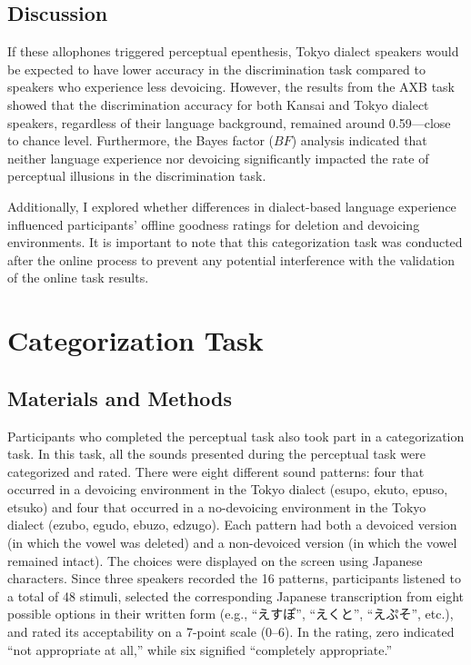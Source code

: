 \subsection{Discussion}

If these allophones triggered perceptual epenthesis, Tokyo dialect speakers would be expected to have lower accuracy in the discrimination task compared to speakers who experience less devoicing. However, the results from the AXB task showed that the discrimination accuracy for both Kansai and Tokyo dialect speakers, regardless of their language background, remained around 0.59---close to chance level. Furthermore, the Bayes factor ($BF$) analysis indicated that neither language experience nor devoicing significantly impacted the rate of perceptual illusions in the discrimination task.

Additionally, I explored whether differences in dialect-based language experience influenced participants' offline goodness ratings for deletion and devoicing environments. It is important to note that this categorization task was conducted after the online process to prevent any potential interference with the validation of the online task results.

\section{Categorization Task}

\subsection{Materials and Methods}

Participants who completed the perceptual task also took part in a categorization task.  
In this task, all the sounds presented during the perceptual task were categorized and rated.  
There were eight different sound patterns:  
four that occurred in a devoicing environment in the Tokyo dialect (esupo, ekuto, epuso, etsuko)  
and four that occurred in a no-devoicing environment in the Tokyo dialect (ezubo, egudo, ebuzo, edzugo).  
Each pattern had both a devoiced version (in which the vowel was deleted)  
and a non-devoiced version (in which the vowel remained intact).  
The choices were displayed on the screen using Japanese characters.  
Since three speakers recorded the 16 patterns,  
participants listened to a total of 48 stimuli,  
selected the corresponding Japanese transcription from eight possible options in their written form 
(e.g., ``えすぽ'', ``えくと'', ``えぷそ'', etc.),  
and rated its acceptability on a 7-point scale (0--6).  
In the rating, zero indicated ``not appropriate at all,''  
while six signified ``completely appropriate.''  

